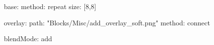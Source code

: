 base:
  method: repeat
  size: [8,8]

overlay:
  path: "Blocks/Misc/add_overlay_soft.png"
  method: connect

blendMode: add
  
